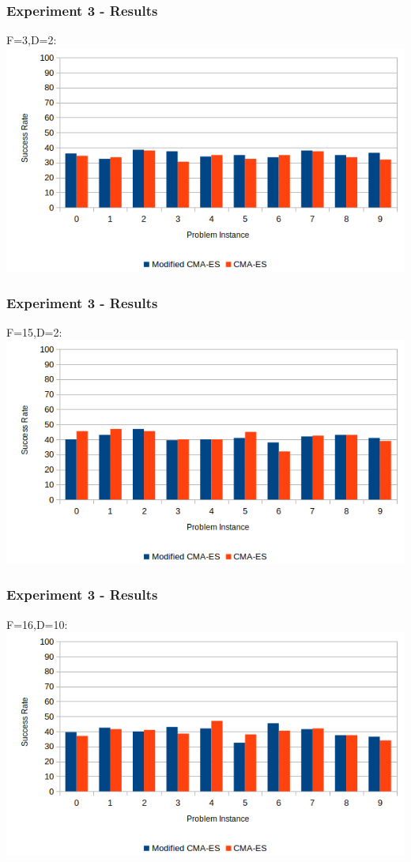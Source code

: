 \documentclass{beamer}
\begin{document}
	
	\begin{frame}
		\frametitle{Experiment 3 - Results}
		\centering
		F=3,D=2:
		\includegraphics[width=\textwidth]{experiment3_f3d2_bargraph}
	\end{frame}	
		
	
	\begin{frame}
		\frametitle{Experiment 3 - Results}
		\centering
		F=15,D=2:
		\includegraphics[width=\textwidth]{experiment3_f15d2_bargraph}
	\end{frame}					
 
	\begin{frame}
		\frametitle{Experiment 3 - Results}
		\centering
		F=16,D=10:
		\includegraphics[width=\textwidth]{experiment3_f16d10_bargraph}
	\end{frame}	 
	
\end{document}
